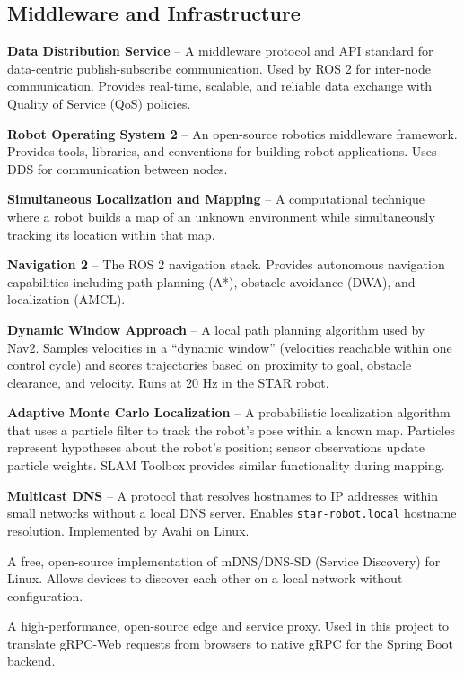 \subsection{Middleware and Infrastructure}

\begin{description}[style=nextline, leftmargin=2cm]
    \item[DDS] \textbf{Data Distribution Service} -- A middleware protocol and API standard for data-centric publish-subscribe communication. Used by ROS 2 for inter-node communication. Provides real-time, scalable, and reliable data exchange with Quality of Service (QoS) policies.

    \item[ROS 2] \textbf{Robot Operating System 2} -- An open-source robotics middleware framework. Provides tools, libraries, and conventions for building robot applications. Uses DDS for communication between nodes.

    \item[SLAM] \textbf{Simultaneous Localization and Mapping} -- A computational technique where a robot builds a map of an unknown environment while simultaneously tracking its location within that map.

    \item[Nav2] \textbf{Navigation 2} -- The ROS 2 navigation stack. Provides autonomous navigation capabilities including path planning (A*), obstacle avoidance (DWA), and localization (AMCL).

    \item[DWA] \textbf{Dynamic Window Approach} -- A local path planning algorithm used by Nav2. Samples velocities in a ``dynamic window'' (velocities reachable within one control cycle) and scores trajectories based on proximity to goal, obstacle clearance, and velocity. Runs at 20 Hz in the STAR robot.

    \item[AMCL] \textbf{Adaptive Monte Carlo Localization} -- A probabilistic localization algorithm that uses a particle filter to track the robot's pose within a known map. Particles represent hypotheses about the robot's position; sensor observations update particle weights. SLAM Toolbox provides similar functionality during mapping.

    \item[mDNS] \textbf{Multicast DNS} -- A protocol that resolves hostnames to IP addresses within small networks without a local DNS server. Enables \texttt{star-robot.local} hostname resolution. Implemented by Avahi on Linux.

    \item[Avahi] A free, open-source implementation of mDNS/DNS-SD (Service Discovery) for Linux. Allows devices to discover each other on a local network without configuration.

    \item[Envoy] A high-performance, open-source edge and service proxy. Used in this project to translate gRPC-Web requests from browsers to native gRPC for the Spring Boot backend.
\end{description}

